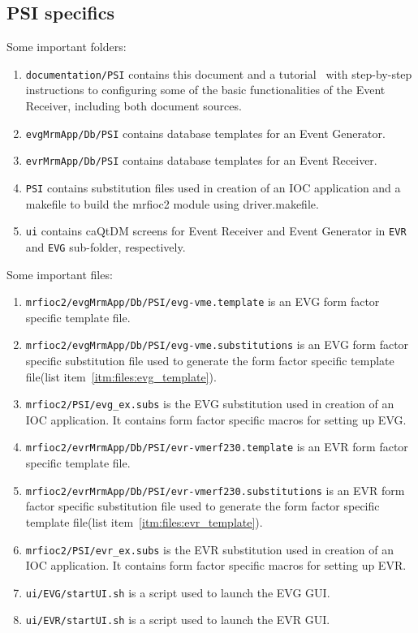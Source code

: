 \documentclass[12pt,a4paper]{article}
\begin{document}
\subsection{PSI specifics}\label{sec:PSI specifics}
Some important folders:
\begin{enumerate}
\item 
	\texttt{documentation/PSI} contains this document and a tutorial~\cite{tutorial} with step-by-step instructions to configuring some of the basic functionalities of the Event Receiver, including both document sources.
\item 
	\texttt{evgMrmApp/Db/PSI} contains database templates for an Event Generator.\label{itm:folder:evg_db}

\item 
	\texttt{evrMrmApp/Db/PSI} contains database templates for an Event Receiver.\label{itm:folder:evr_db}

\item 
	\texttt{PSI} contains substitution files used in creation of an IOC application and a makefile to build the mrfioc2 module using driver.makefile.\label{itm:folder:psi}
\item 
	\texttt{ui} contains caQtDM screens for Event Receiver and Event Generator in \texttt{EVR} and \texttt{EVG} sub-folder, respectively.
\end{enumerate}
Some important files:
\begin{enumerate}
\item 
	\texttt{mrfioc2/evgMrmApp/Db/PSI/evg-vme.template} is an EVG form factor specific template file.\label{itm:files:evg_template}
\item 
	\texttt{mrfioc2/evgMrmApp/Db/PSI/evg-vme.substitutions} is an EVG form factor specific substitution file used to generate the form factor specific template file(list item~\ref{itm:files:evg_template}).\label{itm:files:evg_ff_subs}
\item 
	\texttt{mrfioc2/PSI/evg\_ex.subs} is the EVG substitution used in creation of an IOC application. It contains form factor specific macros for setting up EVG.\label{itm:files:evg_substitution}
\item 
	\texttt{mrfioc2/evrMrmApp/Db/PSI/evr-vmerf230.template} is an EVR form factor specific template file.\label{itm:files:evr_template}
\item 
	\texttt{mrfioc2/evrMrmApp/Db/PSI/evr-vmerf230.substitutions} is an EVR form factor specific substitution file used to generate the form factor specific template file(list item~\ref{itm:files:evr_template}).\label{itm:files:evr_ff_subs}
\item 
	\texttt{mrfioc2/PSI/evr\_ex.subs} is the EVR substitution used in creation of an IOC application. It contains form factor specific macros for setting up EVR.\label{itm:files:evr_substitution}
\item 
	\texttt{ui/EVG/startUI.sh} is a script used to launch the EVG GUI.\label{itm:files:evg_gui}
\item 
	\texttt{ui/EVR/startUI.sh} is a script used to launch the EVR GUI.\label{itm:files:evr_gui}
\end{enumerate}
\end{document}
